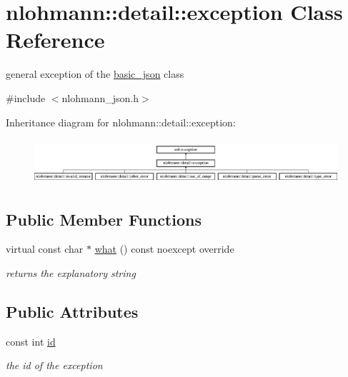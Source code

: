 \hypertarget{classnlohmann_1_1detail_1_1exception}{}\section{nlohmann\+:\+:detail\+:\+:exception Class Reference}
\label{classnlohmann_1_1detail_1_1exception}


general exception of the \hyperlink{classnlohmann_1_1basic__json}{basic\+\_\+json} class  




{\ttfamily \#include $<$nlohmann\+\_\+json.\+h$>$}

Inheritance diagram for nlohmann\+:\+:detail\+:\+:exception\+:\begin{figure}[H]
\begin{center}
\leavevmode
\includegraphics[height=1.680000cm]{de/df2/classnlohmann_1_1detail_1_1exception}
\end{center}
\end{figure}
\subsection*{Public Member Functions}
\begin{DoxyCompactItemize}
\item 
\mbox{\label{classnlohmann_1_1detail_1_1exception_a86b7eaa74e0b2d645bf399be693237ac}} 
virtual const char $\ast$ \hyperlink{classnlohmann_1_1detail_1_1exception_a86b7eaa74e0b2d645bf399be693237ac}{what} () const noexcept override
\begin{DoxyCompactList}\small\item\em returns the explanatory string \end{DoxyCompactList}\end{DoxyCompactItemize}
\subsection*{Public Attributes}
\begin{DoxyCompactItemize}
\item 
\mbox{\label{classnlohmann_1_1detail_1_1exception_a0d4589a3fb54e81646d986c05efa3b9a}} 
const int \hyperlink{classnlohmann_1_1detail_1_1exception_a0d4589a3fb54e81646d986c05efa3b9a}{id}
\begin{DoxyCompactList}\small\item\em the id of the exception \end{DoxyCompactList}\end{DoxyCompactItemize}
